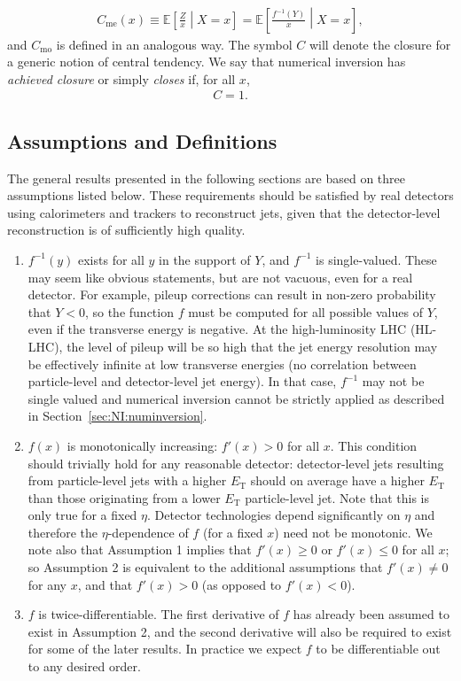 \begin{align}
C_\text{me}(x) \equiv \mathbb{E}\left[\frac{Z}{x}\middle| X=x\right] = \mathbb{E}\left[\frac{f^{-1}(Y)}{x}\middle| X=x\right]
\label{eqn:NI:closure},
\end{align}
and $C_\text{mo}$ is defined in an analogous way.  The symbol $C$ will denote the closure for a generic notion of central tendency.  We say that numerical inversion has {\it achieved closure} or simply {\it closes} if, for all $x$,
\begin{align}
C = 1.
\end{align}

\subsection{Assumptions and Definitions}
\label{sec:NI:assumptions}

The general results presented in the following sections are based on three assumptions listed below.  These requirements should be satisfied by real detectors using calorimeters and trackers to reconstruct jets, given that the detector-level reconstruction is of sufficiently high quality.

\begin{enumerate}
\item $f^{-1}(y)$ exists for all $y$ in the support of $Y$, and $f^{-1}$ is single-valued.  These may seem like obvious statements, but are not vacuous, even for a real detector.  For example, pileup corrections can result in non-zero probability that $Y<0$, so the function $f$ must be computed for all possible values of $Y$, even if the transverse energy is negative.  At the high-luminosity LHC (HL-LHC), the level of pileup will be so high that the jet energy resolution may be effectively infinite at low transverse energies (no correlation between particle-level and detector-level jet energy).  In that case, $f^{-1}$ may not be single valued and numerical inversion cannot be strictly applied as described in Section~\ref{sec:NI:numinversion}.
\item $f(x)$ is monotonically increasing: $f'(x)>0$ for all $x$.  This condition should trivially hold for any reasonable detector: detector-level jets resulting from particle-level jets with a higher $E_\text{T}$ should on average have a higher $E_\text{T}$ than those originating from a lower $E_\text{T}$ particle-level jet.  Note that this is only true for a fixed $\eta$.  Detector technologies depend significantly on $\eta$ and therefore the $\eta$-dependence of $f$ (for a fixed $x$) need not be monotonic. We note also that Assumption 1 implies that $f'(x)\ge 0$ or $f'(x) \le 0$ for all $x$; so Assumption 2 is equivalent to the additional assumptions that $f'(x)\ne 0$ for any $x$, and that $f'(x)>0$ (as opposed to $f'(x)<0$).
\item $f$ is twice-differentiable. The first derivative of $f$ has already been assumed to exist in Assumption 2, and the second derivative will also be required to exist for some of the later results. In practice we expect $f$ to be differentiable out to any desired order.
\end{enumerate}

